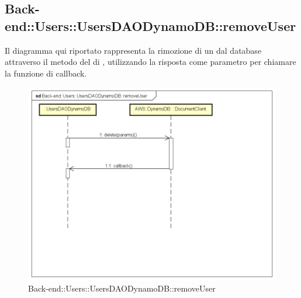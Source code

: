 \subsection{Back-end::Users::UsersDAODynamoDB::removeUser}
Il diagramma qui riportato rappresenta la rimozione di un  dal database attraverso il metodo  del  di , utilizzando la risposta come parametro per chiamare la funzione di callback.
 \begin{figure}[h] \centering \includegraphics[width=\textwidth,height=\textheight,keepaspectratio]{images/diagrams/back-end/Ufficial_Backend/Back-endUsersUsersDAODynamoDBremoveUser.png} 	\caption{Back-end::Users::UsersDAODynamoDB::removeUser}
\end{figure} 
\newpage

